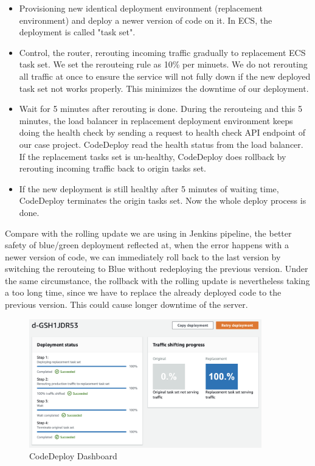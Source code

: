 \begin{itemize}
 \item Provisioning new identical deployment environment (replacement environment) and deploy a newer version of code on it. In ECS, the deployment is called "task set".
 \item Control, the router, rerouting incoming traffic gradually to replacement ECS task set. We set the rerouteing rule as 10\% per minuets. We do not rerouting all traffic at once to ensure the service will not fully down if the new deployed task set not works properly. This minimizes the downtime of our deployment.
 \item Wait for 5 minutes after rerouting is done. During the rerouteing and this 5 minutes, the load balancer in replacement deployment environment keeps doing the health check by sending a request to health check API endpoint of our case project. CodeDeploy read the health status from the load balancer. If the replacement tasks set is un-healthy, CodeDeploy does rollback by rerouting incoming traffic back to origin tasks set.
 \item If the new deployment is still healthy after 5 minutes of waiting time, CodeDeploy terminates the origin tasks set. Now the whole deploy process is done.
\end{itemize}
Compare with the rolling update we are using in Jenkins pipeline, the better safety of blue/green deployment reflected at, when the error happens with a newer version of code, we can immediately roll back to the last version by switching the rerouteing to Blue \cite{UsingBlu65:online} without redeploying the previous version. Under the same circumstance, the rollback with the rolling update is nevertheless taking a too long time, since we have to replace the already deployed code to the previous version. This could cause longer downtime of the server. 
\begin{figure}[h]
 \centering
 \includegraphics[width=0.90\textwidth]{pics/codedeploy_steps.png}
 \caption{CodeDeploy Dashboard}
 \label{fig:codedeploy_steps}
\end{figure}
